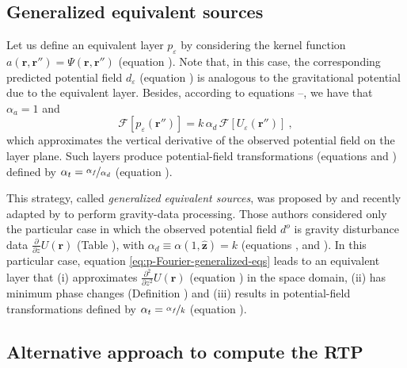 \subsection{Generalized equivalent sources}

Let us define an equivalent layer $p_{\varepsilon}$ by considering the kernel function 
$a(\mathbf{r}, \mathbf{r}'') = \Psi(\mathbf{r}, \mathbf{r}'')$ (equation ). 
Note that, in this case, 
the corresponding predicted potential field $d_{\varepsilon}$ (equation ) 
is analogous to the gravitational potential due to the equivalent layer.
Besides, according to equations --, we have that 
$\alpha_{a} = 1$ and 
\begin{equation}
	\mathcal{F} [ p_{\varepsilon}(\mathbf{r}'') ] =
	k \, \alpha_{d} \, \mathcal{F} \left[ U_{\varepsilon}(\mathbf{r}'') \right]  \: ,
	\label{eq:p-Fourier-generalized-eqs}
\end{equation}
which approximates the vertical derivative of the observed potential field on the layer plane. 
Such layers produce potential-field transformations (equations  and 
) defined by $\alpha_{t} = \nicefrac{\alpha_{f}}{\alpha_{d}}$ (equation ).

This strategy, called \textit{generalized equivalent sources}, was proposed by \citet{cordell1992} and recently adapted by 
\citet{soler_uieda2021} to perform gravity-data processing. 
Those authors considered only the particular case in which the observed potential field $d^{o}$ is gravity disturbance data 
$\tfrac{\partial}{\partial z} U(\mathbf{r})$  (Table ), 
with $\alpha_{d} \equiv \alpha(1, \hat{\mathbf{z}}) = k$ (equations , 
 and ).
In this particular case, equation \ref{eq:p-Fourier-generalized-eqs} leads to an equivalent layer that 
(i) approximates $\tfrac{\partial^{2}}{\partial z^{2}} U(\mathbf{r})$ (equation ) 
in the space domain, 
(ii) has minimum phase changes (Definition ) and 
(iii) results in potential-field transformations defined by $\alpha_{t} = \nicefrac{\alpha_{f}}{k}$ (equation ).

\subsection{Alternative approach to compute the RTP}

